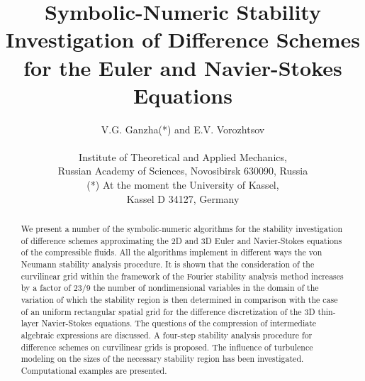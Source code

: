 \pagestyle{plain}
\title{Symbolic-Numeric Stability Investigation of Difference Schemes for the
Euler and Navier-Stokes Equations}
\author{
V.G. Ganzha(*) and E.V. Vorozhtsov\\
\\
            Institute of Theoretical and Applied Mechanics,\\
           Russian Academy of Sciences, Novosibirsk 630090, Russia\\
(*) At the moment the University of Kassel,\\
Kassel D 34127, Germany}
\date{}

\maketitle
\begin{abstract}
\hspace{6mm}
            We present a number of the symbolic-numeric algorithms for the
       stability investigation of difference schemes approximating the 2D
       and 3D Euler and Navier-Stokes equations of the compressible fluids.
       All the algorithms implement in different ways the von Neumann
       stability analysis procedure. It is shown that the consideration of
       the curvilinear grid within the framework of the Fourier stability
       analysis method increases by a factor of 23/9 the number of
       nondimensional variables in the domain of the variation of which the
       stability region is then determined in comparison with the case of an
       uniform rectangular spatial grid for the difference discretization of
       the 3D thin-layer Navier-Stokes equations. The questions
       of the compression of intermediate algebraic expressions are
       discussed. A four-step stability analysis procedure for difference
       schemes on curvilinear grids is proposed. The influence of turbulence
       modeling on the sizes of the necessary stability region has been
       investigated. Computational examples are presented.
\end{abstract}

